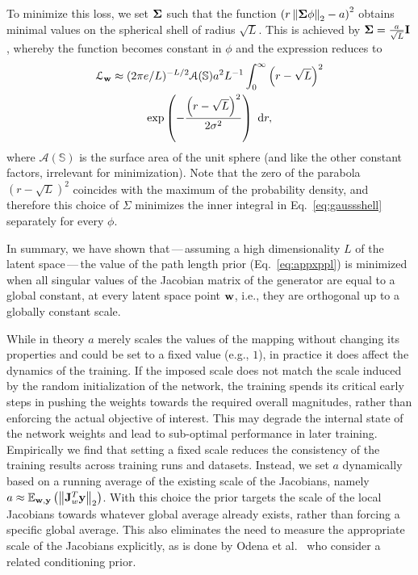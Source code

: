 To minimize this loss, we set ${\bf \Sigma}$ such that the function $\left(r\left\lVert {\bf \Sigma} \phi \right\rVert_2 - a\right)^2$ obtains minimal values on the spherical shell of radius $\sqrt{L}$. This is achieved by ${\bf \Sigma} = \frac{a}{\sqrt{L}} \mathbf{I}$, whereby the function becomes constant in $\phi$ and the expression reduces to
\begin{multline*}
	\mathcal{L}_{{\bf w}} \approx (2\pi e/L)^{-L/2} \mathcal{A}(\mathbb{S}) a^2 L^{-1} \int_0^\infty \left(r - \sqrt{L}\right)^2 \\ 
	\mathrm{exp}\left(-\frac{\left(r-\sqrt{L}\right)^2}{2 \sigma^2}\right) ~ \mathrm{d}r,
\end{multline*}
where $\mathcal{A}(\mathbb{S})$ is the surface area of the unit sphere (and like the other constant factors, irrelevant for minimization). Note that the zero of the parabola $(r-\sqrt{L})^2$ coincides with the maximum of the probability density, and therefore this choice of $\Sigma$ minimizes the inner integral in Eq.~\ref{eq:gaussshell} separately for every $\phi$.

In summary, we have shown that\,---\,assuming a high dimensionality $L$ of the latent space\,---\,the value of the path length prior (Eq.~\ref{eq:appxppl}) is minimized when all singular values of the Jacobian matrix of the generator are equal to a global constant, at every latent space point ${\bf w}$, i.e., they are orthogonal up to a globally constant scale.

While in theory $a$ merely scales the values of the mapping without changing its properties and could be set to a fixed value (e.g., $1$), in practice it does affect the dynamics of the training. If the imposed scale does not match the scale induced by the random initialization of the network, the training spends its critical early steps in pushing the weights towards the required overall magnitudes, rather than enforcing the actual objective of interest. This may degrade the internal state of the network weights and lead to sub-optimal performance in later training. Empirically we find that setting a fixed scale reduces the consistency of the training results across training runs and datasets. Instead, we set $a$ dynamically based on a running average of the existing scale of the Jacobians, namely $a \approx \mathbb{E}_{{\bf w},{\bf y}} \left(\left\lVert {\bf J}^T_w {\bf y}\right\rVert_2\right)$. With this choice the prior targets the scale of the local Jacobians towards whatever global average already exists, rather than forcing a specific global average. This also eliminates the need to measure the appropriate scale of the Jacobians explicitly, as is done by Odena et al.~\cite{Odena2018} who consider a related conditioning prior.

